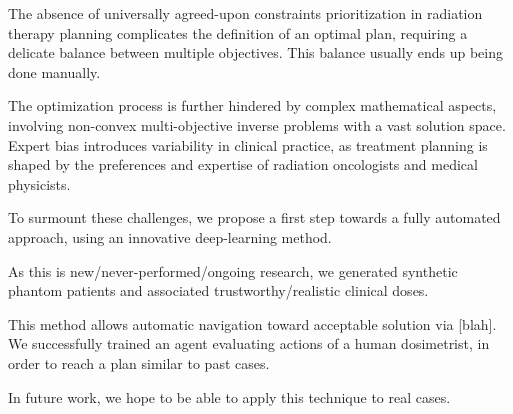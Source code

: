 
The absence of universally agreed-upon constraints prioritization in radiation therapy planning complicates the definition of an optimal plan, requiring a delicate balance between multiple objectives. This balance usually ends up being done manually. %

The optimization process is further hindered by complex mathematical aspects, involving non-convex multi-objective inverse problems with a vast solution space.
Expert bias introduces variability in clinical practice, as treatment planning is shaped by the preferences and expertise of radiation oncologists and medical physicists.

To surmount these challenges, we propose a first step towards a fully automated approach, using an innovative deep-learning method.

As this is new/never-performed/ongoing research, we generated synthetic phantom patients and associated trustworthy/realistic clinical doses.%

This method allows automatic navigation toward acceptable solution via [blah].
We successfully trained an agent evaluating actions of a human dosimetrist, in order to reach a plan similar to past cases.

In future work, we hope to be able to apply this technique to real cases.





